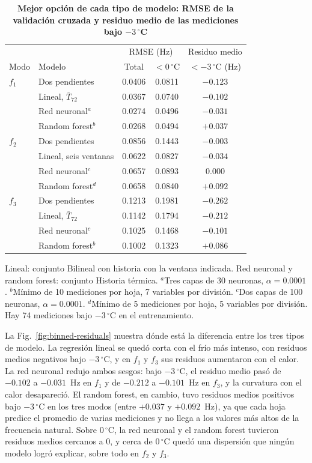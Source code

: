 \documentclass[9pt,twocolumn,twoside]{opticajnl}
\begin{document}
\begin{table}[!htb]
\centering
\caption{\bf Mejor opción de cada tipo de modelo: RMSE de la validación cruzada y residuo medio de las mediciones bajo $-3\,^\circ$C}
\small
\setlength{\tabcolsep}{3pt}
\begin{tabular}{llccc}
\hline
 & & \multicolumn{2}{c}{RMSE (Hz)} & Residuo medio \\
Modo & Modelo & Total & $<0\,^\circ$C & $<-3\,^\circ$C (Hz) \\
\hline
$f_1$ & Dos pendientes & 0.0406 & 0.0811 & $-0.123$ \\
 & Lineal, $\bar{T}_{72}$ & 0.0367 & 0.0740 & $-0.102$ \\
 & Red neuronal$^\textit{a}$ & 0.0274 & 0.0496 & $-0.031$ \\
 & Random forest$^\textit{b}$ & 0.0268 & 0.0494 & $+0.037$ \\
\hline
$f_2$ & Dos pendientes & 0.0856 & 0.1443 & $-0.003$ \\
 & Lineal, seis ventanas & 0.0622 & 0.0827 & $-0.034$ \\
 & Red neuronal$^\textit{c}$ & 0.0657 & 0.0893 & $0.000$ \\
 & Random forest$^\textit{d}$ & 0.0658 & 0.0840 & $+0.092$ \\
\hline
$f_3$ & Dos pendientes & 0.1213 & 0.1981 & $-0.262$ \\
 & Lineal, $\bar{T}_{72}$ & 0.1142 & 0.1794 & $-0.212$ \\
 & Red neuronal$^\textit{c}$ & 0.1025 & 0.1468 & $-0.101$ \\
 & Random forest$^\textit{b}$ & 0.1002 & 0.1323 & $+0.086$ \\
\hline
\end{tabular}
  \label{tab:model-types}

\smallskip
\footnotesize
Lineal: conjunto Bilineal con historia con la ventana indicada. Red neuronal y random forest: conjunto Historia térmica. $^\textit{a}$Tres capas de 30 neuronas, $\alpha = 0.0001$. $^\textit{b}$Mínimo de 10 mediciones por hoja, 7 variables por división. $^\textit{c}$Dos capas de 100 neuronas, $\alpha = 0.0001$. $^\textit{d}$Mínimo de 5 mediciones por hoja, 5 variables por división. Hay 74 mediciones bajo $-3\,^\circ$C en el entrenamiento.
\end{table}

La Fig.~\ref{fig:binned-residuals} muestra dónde está la diferencia entre los tres tipos de modelo. La regresión lineal se quedó corta con el frío más intenso, con residuos medios negativos bajo $-3\,^\circ$C, y en $f_1$ y $f_3$ sus residuos aumentaron con el calor. La red neuronal redujo ambos sesgos: bajo $-3\,^\circ$C, el residuo medio pasó de $-0.102$ a $-0.031$~Hz en $f_1$ y de $-0.212$ a $-0.101$~Hz en $f_3$, y la curvatura con el calor desapareció. El random forest, en cambio, tuvo residuos medios positivos bajo $-3\,^\circ$C en los tres modos (entre $+0.037$ y $+0.092$~Hz), ya que cada hoja predice el promedio de varias mediciones y no llega a los valores más altos de la frecuencia natural. Sobre $0\,^\circ$C, la red neuronal y el random forest tuvieron residuos medios cercanos a 0, y cerca de $0\,^\circ$C quedó una dispersión que ningún modelo logró explicar, sobre todo en $f_2$ y $f_3$.
\end{document}
